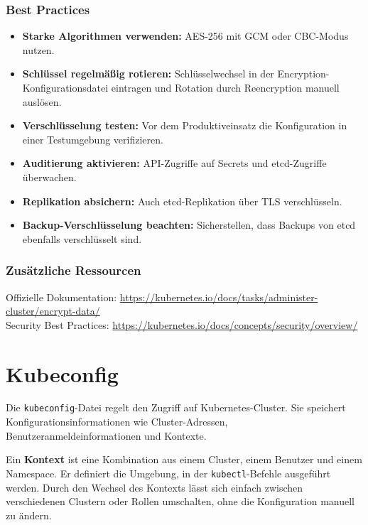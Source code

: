 \subsubsection{Best Practices}
\begin{itemize}
    \item \textbf{Starke Algorithmen verwenden:} AES-256 mit GCM oder CBC-Modus nutzen.
    \item \textbf{Schlüssel regelmäßig rotieren:} Schlüsselwechsel in der Encryption-Konfigurationsdatei eintragen und Rotation durch Reencryption manuell auslösen.
    \item \textbf{Verschlüsselung testen:} Vor dem Produktiveinsatz die Konfiguration in einer Testumgebung verifizieren.
    \item \textbf{Auditierung aktivieren:} API-Zugriffe auf Secrets und etcd-Zugriffe überwachen.
    \item \textbf{Replikation absichern:} Auch etcd-Replikation über TLS verschlüsseln.
    \item \textbf{Backup-Verschlüsselung beachten:} Sicherstellen, dass Backups von etcd ebenfalls verschlüsselt sind.
\end{itemize}
\subsubsection{Zusätzliche Ressourcen}

Offizielle Dokumentation: \url{https://kubernetes.io/docs/tasks/administer-cluster/encrypt-data/}\\
Security Best Practices: \url{https://kubernetes.io/docs/concepts/security/overview/}
\newpage

\section{Kubeconfig}

Die \texttt{kubeconfig}-Datei regelt den Zugriff auf Kubernetes-Cluster. Sie speichert Konfigurationsinformationen wie Cluster-Adressen, Benutzeranmeldeinformationen und Kontexte.

\noindent
Ein \textbf{Kontext} ist eine Kombination aus einem Cluster, einem Benutzer und einem Namespace. Er definiert die Umgebung, in der \texttt{kubectl}-Befehle ausgeführt werden. Durch den Wechsel des Kontexts lässt sich einfach zwischen verschiedenen Clustern oder Rollen umschalten, ohne die Konfiguration manuell zu ändern.\\

